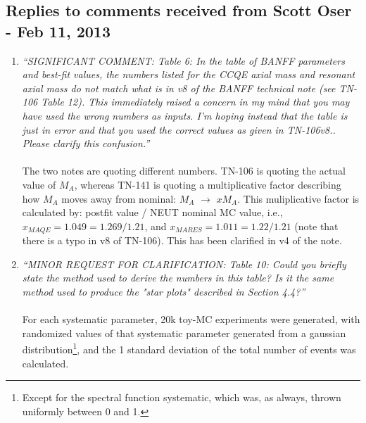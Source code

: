 \subsection{
  Replies to comments received from Scott Oser - Feb 11, 2013 }

\begin{enumerate}

\vspace{5 mm}
\item
{\em
  ``SIGNIFICANT COMMENT: Table 6: In the table of BANFF parameters and best-fit values, the numbers listed for the 
  CCQE axial mass and resonant axial mass do not match what is in v8 of the BANFF technical note (see TN-106 Table 12).  
  This immediately raised a concern in my mind that you may have used the wrong numbers as inputs.  
  I'm hoping instead that the table is just in error and that you used the correct values as given in TN-106v8..  
  Please clarify this confusion.''
}\\
\\
The two notes are quoting different numbers.
TN-106 is quoting the actual value of $M_A$, whereas TN-141 is
quoting a multiplicative factor describing how $M_A$ moves away from
nominal: $M_A$ $\rightarrow$ $x M_A$.
This muliplicative factor is calculated by: 
postfit value / NEUT nominal MC value,
i.e., $x_{MAQE} = 1.049 = 1.269 / 1.21$,
and $x_{MARES} = 1.011 = 1.22 / 1.21$ (note that there is a typo in v8
of TN-106).
This has been clarified in v4 of the note.

\vspace{5 mm}
\item
{\em
  ``MINOR REQUEST FOR CLARIFICATION: Table 10: Could you briefly state the method used to derive the numbers in this table?  
  Is it the same method used to produce the "star plots" described in Section 4.4?''
}\\
\\
For each systematic parameter, 20k toy-MC experiments were generated, with randomized values of that systematic
parameter generated from a gaussian distribution\footnote{
Except for the spectral function systematic, which was, as always,
thrown uniformly between 0 and 1.}, and the 1 standard deviation of the total number of events was calculated.


\end{enumerate}
